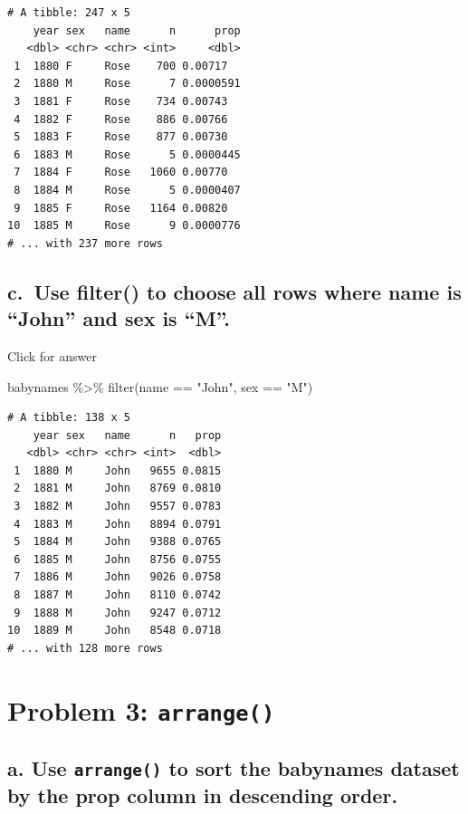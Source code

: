 \documentclass[
]{book}
\newenvironment{Shaded}{\begin{snugshade}}{\end{snugshade}}
\newcommand{\FunctionTok}[1]{\textcolor[rgb]{0.00,0.00,0.00}{#1}}
\newcommand{\NormalTok}[1]{#1}
\newcommand{\SpecialCharTok}[1]{\textcolor[rgb]{0.00,0.00,0.00}{#1}}
\newcommand{\StringTok}[1]{\textcolor[rgb]{0.31,0.60,0.02}{#1}}
\begin{document}
\begin{verbatim}
# A tibble: 247 x 5
    year sex   name      n      prop
   <dbl> <chr> <chr> <int>     <dbl>
 1  1880 F     Rose    700 0.00717  
 2  1880 M     Rose      7 0.0000591
 3  1881 F     Rose    734 0.00743  
 4  1882 F     Rose    886 0.00766  
 5  1883 F     Rose    877 0.00730  
 6  1883 M     Rose      5 0.0000445
 7  1884 F     Rose   1060 0.00770  
 8  1884 M     Rose      5 0.0000407
 9  1885 F     Rose   1164 0.00820  
10  1885 M     Rose      9 0.0000776
# ... with 237 more rows
\end{verbatim}

\hypertarget{c.-use-filter-to-choose-all-rows-where-name-is-john-and-sex-is-m.}{%
\subsection{c.~Use filter() to choose all rows where name is ``John'' and sex is ``M''.}\label{c.-use-filter-to-choose-all-rows-where-name-is-john-and-sex-is-m.}}

Click for answer

\begin{Shaded}
\begin{Highlighting}[]
\NormalTok{babynames }\SpecialCharTok{\%\textgreater{}\%} \FunctionTok{filter}\NormalTok{(name }\SpecialCharTok{==} \StringTok{"John"}\NormalTok{, sex }\SpecialCharTok{==} \StringTok{"M"}\NormalTok{)}
\end{Highlighting}
\end{Shaded}

\begin{verbatim}
# A tibble: 138 x 5
    year sex   name      n   prop
   <dbl> <chr> <chr> <int>  <dbl>
 1  1880 M     John   9655 0.0815
 2  1881 M     John   8769 0.0810
 3  1882 M     John   9557 0.0783
 4  1883 M     John   8894 0.0791
 5  1884 M     John   9388 0.0765
 6  1885 M     John   8756 0.0755
 7  1886 M     John   9026 0.0758
 8  1887 M     John   8110 0.0742
 9  1888 M     John   9247 0.0712
10  1889 M     John   8548 0.0718
# ... with 128 more rows
\end{verbatim}

\hypertarget{problem-3-arrange}{%
\section{\texorpdfstring{Problem 3: \texttt{arrange()}}{Problem 3: arrange()}}\label{problem-3-arrange}}

\hypertarget{a.-use-arrange-to-sort-the-babynames-dataset-by-the-prop-column-in-descending-order.}{%
\subsection{\texorpdfstring{a. Use \texttt{arrange()} to sort the babynames dataset by the prop column in descending order.}{a. Use arrange() to sort the babynames dataset by the prop column in descending order.}}\label{a.-use-arrange-to-sort-the-babynames-dataset-by-the-prop-column-in-descending-order.}}
\end{document}

